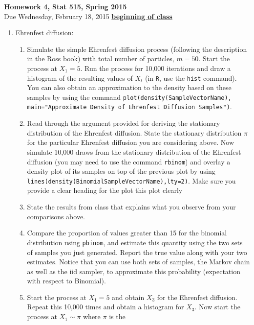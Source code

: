 \documentclass{article}
\begin{document}
\begin{center}
\Large
{\bf Homework 4, Stat 515, Spring 2015}\\
\normalsize
Due Wednesday, February 18, 2015 \underline{{\bf beginning of class}}\\
\end{center}
\begin{enumerate}%
\item Ehrenfest diffusion: 
\begin{enumerate}
\item Simulate the simple Ehrenfest diffusion process (following the
  description in the Ross book) with total number of particles,
  $m=50$. Start the process at $X_1=5$. Run the process for 10,000
  iterations and draw a histogram of the resulting values of $X_t$ (in
  {\tt R}, use the {\tt hist} command). You can also obtain an
  approximation to the density based on these samples by using the
  command {\tt plot(density(SampleVectorName), main="Approximate
    Density of Ehrenfest Diffusion Samples")}.
\item Read through the argument provided for deriving the stationary
  distribution of the Ehrenfest diffusion. State the stationary
  distribution $\pi$ for the particular Ehrenfest diffusion you are
  considering above. Now simulate 10,000 draws from the stationary
  distribution of the Ehrenfest diffusion (you may need to use the
  command {\tt rbinom}) and overlay a density plot of its samples on
  top of the previous plot by using {\tt
    lines(density(BinomialSampleVectorName),lty=2)}. Make sure you provide a
  clear heading for the plot 
  this plot clearly
\item State the results from class that explains what you observe from
  your comparisons above. 
\item Compare the proportion of values greater than 15 for the
  binomial distribution using {\tt pbinom}, and estimate this quantity
  using the two sets of samples you just generated. Report the true
  value along with your two estimates. Notice that you can use both
  sets of samples, the Markov chain as well as the iid sampler, to
  approximate this probability (expectation with respect to Binomial).
\item Start the process at $X_1=5$ and obtain $X_3$ for the Ehrenfest
  diffusion. Repeat this 10,000 times and obtain a histogram for
  $X_3$. Now start the process at $X_1 \sim \pi$ where $\pi$ is the

\end{enumerate}
\end{enumerate}
\end{document}
